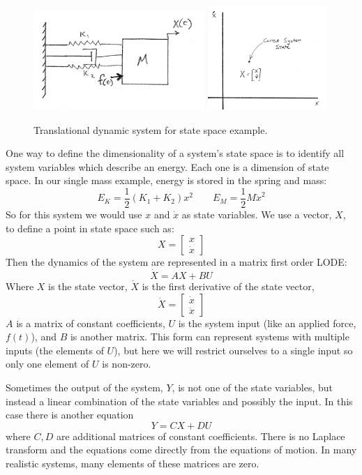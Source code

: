 \begin{figure}\centering
\includegraphics[width=65mm]{figs04/01069.png}   \hspace{0.25in}
\includegraphics[width=45mm]{figs04/01075.png}
\caption{Translational dynamic system for state space example.}\label{2Dstatespace}
\end{figure}

One way to define the dimensionality of a system's state space is to identify all system variables which describe an energy.  Each one is a dimension of state space.   In our single mass example, energy is stored in the spring and mass:
\[
E_K = \frac{1}{2}(K_1 + K_2)x^2 \qquad E_M = \frac{1}{2}M{\dot{x}}^2
\]
So for this system we would use $x$ and $\dot{x}$ as state variables.
We use a vector, $X$, to define a point in state space such as:
\[
X = \begin{bmatrix} x \\ \dot{x} \end{bmatrix}
\]
Then the dynamics of the system are represented in a matrix first order LODE:
\[
\dot{X} = AX+BU
\]
Where $X$ is the state vector, $\dot{X}$ is the first derivative of the state vector,
\[
\dot{X} = \begin{bmatrix}\dot{x} \\ \ddot{x} \end{bmatrix}
\]
$A$ is a matrix of constant coefficients,
$U$ is the system input (like an applied force, $f(t)$), and
$B$ is another matrix.  This form can represent systems with multiple inputs (the elements of $U$), but here we will restrict ourselves to a single input so only one element of $U$ is non-zero.

Sometimes the output of the system, $Y$, is not one of the state variables, but instead a linear
combination of the state variables and possibly the input.  In this case there is another equation
\[
Y = CX+DU
\]
where $C,D$ are additional matrices of constant coefficients.
There is no Laplace transform and the
equations come directly from the equations of motion. In many realistic systems,
many  elements of these matrices are zero.



